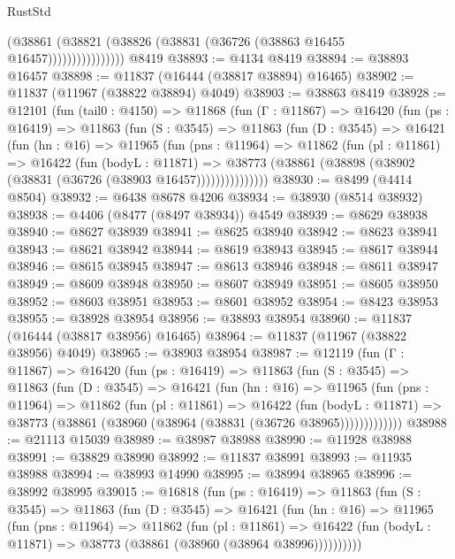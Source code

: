 \begin{lexlean}{RustStd}
\begin{coremodule}
{\begin{coremodule}
{{{{{{{{{{{{{{{{{{{{{{{{{{{{{{{{{{{{{{{{{{{{{{{{{{                        (@38861
                          (@38821 (@38826 (@38831 (@36726 (@38863 @16455 @16457))))))))))))))))
    @8419
@38893 := @4134 @8419
@38894 := @38893 @16457
@38898 := @11837 (@16444 (@38817 @38894) @16465)
@38902 := @11837 (@11967 (@38822 @38894) @4049)
@38903 := @38863 @8419
@38928 := @12101
    (fun (tail0 : @4150) =>
    @11868
      (fun (Γ : @11867) =>
      @16420
        (fun (ps : @16419) =>
        @11863
          (fun (S : @3545) =>
          @11863
            (fun (D : @3545) =>
            @16421
              (fun (hn : @16) =>
              @11965
                (fun (pns : @11964) =>
                @11862
                  (fun (pl : @11861) =>
                  @16422
                    (fun (bodyL : @11871) =>
                    @38773 (@38861 (@38898 (@38902 (@38831 (@36726 (@38903 @16457)))))))))))))))
@38930 := @8499 (@4414 @8504)
@38932 := @6438 @8678 @4206
@38934 := @38930 (@8514 @38932)
@38938 := @4406 (@8477 (@8497 @38934)) @4549
@38939 := @8629 @38938
@38940 := @8627 @38939
@38941 := @8625 @38940
@38942 := @8623 @38941
@38943 := @8621 @38942
@38944 := @8619 @38943
@38945 := @8617 @38944
@38946 := @8615 @38945
@38947 := @8613 @38946
@38948 := @8611 @38947
@38949 := @8609 @38948
@38950 := @8607 @38949
@38951 := @8605 @38950
@38952 := @8603 @38951
@38953 := @8601 @38952
@38954 := @8423 @38953
@38955 := @38928 @38954
@38956 := @38893 @38954
@38960 := @11837 (@16444 (@38817 @38956) @16465)
@38964 := @11837 (@11967 (@38822 @38956) @4049)
@38965 := @38903 @38954
@38987 := @12119
    (fun (Γ : @11867) =>
    @16420
      (fun (ps : @16419) =>
      @11863
        (fun (S : @3545) =>
        @11863
          (fun (D : @3545) =>
          @16421
            (fun (hn : @16) =>
            @11965
              (fun (pns : @11964) =>
              @11862
                (fun (pl : @11861) =>
                @16422
                  (fun (bodyL : @11871) =>
                  @38773 (@38861 (@38960 (@38964 (@38831 (@36726 @38965)))))))))))))
@38988 := @21113 @15039
@38989 := @38987 @38988
@38990 := @11928 @38988
@38991 := @38829 @38990
@38992 := @11837 @38991
@38993 := @11935 @38988
@38994 := @38993 @14990
@38995 := @38994 @38965
@38996 := @38992 @38995
@39015 := @16818
    (fun (ps : @16419) =>
    @11863
      (fun (S : @3545) =>
      @11863
        (fun (D : @3545) =>
        @16421
          (fun (hn : @16) =>
          @11965
            (fun (pns : @11964) =>
            @11862
              (fun (pl : @11861) =>
              @16422 (fun (bodyL : @11871) => @38773 (@38861 (@38960 (@38964 @38996))))))))))
}}}}}}}}}}}}}}}}}}}}}}}}}}}}}}}}}}}}}}}}}}}}}}}}}}
\end{coremodule}}
\end{coremodule}
\end{lexlean}
